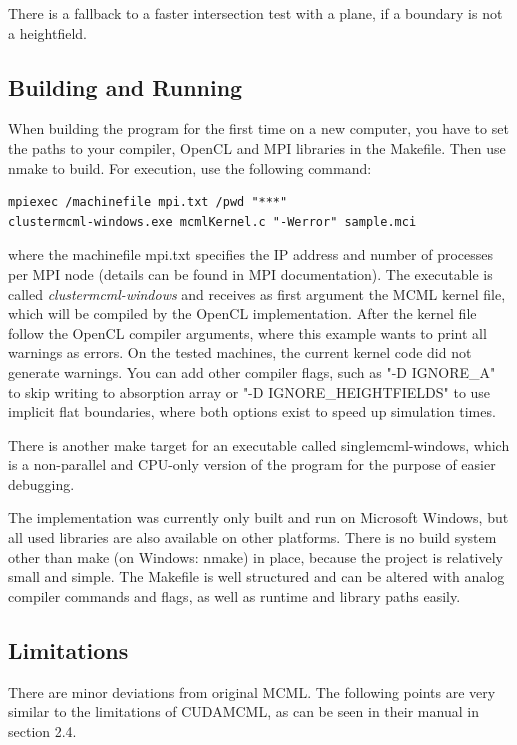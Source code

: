 \documentclass[]{article}
\begin{document}
There is a fallback to a faster intersection test with a plane, if a boundary is not a heightfield.

\subsection{Building and Running}

When building the program for the first time on a new computer, you have to set the paths to your compiler, OpenCL and MPI libraries in the Makefile. Then use nmake to build. For execution, use the following command:

\begin{lstlisting}
mpiexec /machinefile mpi.txt /pwd "***"
clustermcml-windows.exe mcmlKernel.c "-Werror" sample.mci
\end{lstlisting}

where the machinefile mpi.txt specifies the IP address and number of processes per MPI node (details can be found in MPI documentation). The executable is called \emph{clustermcml-windows} and receives as first argument the MCML kernel file, which will be compiled by the OpenCL implementation. After the kernel file follow the OpenCL compiler arguments, where this example wants to print all warnings as errors. On the tested machines, the current kernel code did not generate warnings. You can add other compiler flags, such as "-D IGNORE\_A" to skip writing to absorption array or "-D IGNORE\_HEIGHTFIELDS" to use implicit flat boundaries, where both options exist to speed up simulation times.

There is another make target for an executable called singlemcml-windows, which is a non-parallel and CPU-only version of the program for the purpose of easier debugging.

The implementation was currently only built and run on Microsoft Windows, but all used libraries are also available on other platforms. There is no build system other than make (on Windows: nmake) in place, because the project is relatively small and simple. The Makefile is well structured and can be altered with analog compiler commands and flags, as well as runtime and library paths easily.

\subsection{Limitations}

There are minor deviations from original MCML. The following points are very similar to the limitations of CUDAMCML, as can be seen in their manual in section 2.4.
\end{document}
